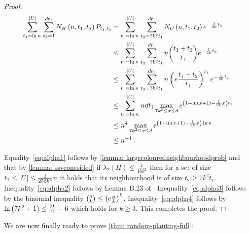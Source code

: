 \begin{proof}
    \begin{align}
    \sum_{t_1=\ln n\,}^{\Abs{U}}\sum_{t_2=1}^{d t_1}N_{H}\Paren{n,t_1,t_2}P_{t_1,t_2} & =\sum_{t_1=\ln n\,}^{\Abs{U}}\sum_{t_2= 7k^2t_1 }^{d t_1}N_{G}\Paren{n,t_1,t_2}e^{-\frac{1}{2k} t_2}\label{eq:alpha1}\\
    & \le\sum_{t_1=\ln n\,}^{\Abs{U}}\sum_{t_2= 7k^2t_1 }^{d t_1}n\binom{t_1+t_2 }{ t_1}e^{-\frac{1}{2k} t_2}\label{eq:alpha2}\\
    & \le\sum_{t_1=\ln n\,}^{\Abs{U}}\sum_{t_2= 7k^2t_1 }^{d t_1}n\Paren{e\frac{t_1+t_2}{t_1}}^{t_1}e^{-\frac{1}{2k} t_2}\label{eq:alpha3}\\
    & \le\sum_{t_1=\ln n\,}^{\Abs{U}}ndt_1\max_{7k^2\le x\le d}e^{\Paren{1+\ln(x+1)-\frac{1}{2k} x}t_1}\nonumber \\
    & \le n^{4}\max_{7k^2\le x\le d}e^{\Paren{1+\ln(x+1)-\frac{1}{2k} x}\ln{n}}\nonumber\\
    & \le n^{-1}\,.\label{eq:alpha4}
    \end{align}

    Equality~\ref{eq:alpha1} follows by \cref{lemma: largecolouredneighbourhoodprob} and that by \cref{lemma: ssveonesided}
    if $\lambda_2(H)\le \frac{1}{16k^2}$ then for a set of size $t_1\le\left\lvert U\right\rvert\le\frac{1}{256k^4}n$ it holds that its neighbourhood is of size $t_2\ge7k^2t_1$. Inequality~\ref{eq:alpha2} follows by Lemma B.23 of \cite{MR3536556-David16}. Inequality~\ref{eq:alpha3} follows by the binomial inequality ${n \choose k}\le\left(e\frac{n}{k}\right)^{k}$. Inequality~\ref{eq:alpha4} follows by $\ln\left(7k^2+1\right)\leq \frac{7k}{2}-6$ which holds for $k\geq 3$. This completes the proof.
\end{proof}

We are now finally ready to prove \cref{thm: random-planting-full}:

